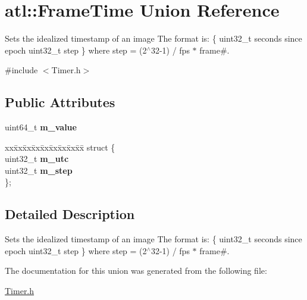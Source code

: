 \hypertarget{unionatl_1_1FrameTime}{}\section{atl\+:\+:Frame\+Time Union Reference}
\label{unionatl_1_1FrameTime}


Sets the idealized timestamp of an image The format is\+: \{ uint32\+\_\+t seconds since epoch uint32\+\_\+t step \} where step = (2$^\wedge$32-\/1) / fps $\ast$ frame\#.  




{\ttfamily \#include $<$Timer.\+h$>$}

\subsection*{Public Attributes}
\begin{DoxyCompactItemize}
\item 
uint64\+\_\+t {\bfseries m\+\_\+value}\hypertarget{unionatl_1_1FrameTime_a8dd45b9a9c6c634f6afa8e46fd99f22e}{}\label{unionatl_1_1FrameTime_a8dd45b9a9c6c634f6afa8e46fd99f22e}

\item 
\begin{tabbing}
xx\=xx\=xx\=xx\=xx\=xx\=xx\=xx\=xx\=\kill
struct \{\\
\>uint32\_t {\bfseries m\_utc}\\
\>uint32\_t {\bfseries m\_step}\\
\}; \hypertarget{unionatl_1_1FrameTime_a4335ca060cc3673ff9cb62a25047e92e}{}\label{unionatl_1_1FrameTime_a4335ca060cc3673ff9cb62a25047e92e}
\\

\end{tabbing}\end{DoxyCompactItemize}


\subsection{Detailed Description}
Sets the idealized timestamp of an image The format is\+: \{ uint32\+\_\+t seconds since epoch uint32\+\_\+t step \} where step = (2$^\wedge$32-\/1) / fps $\ast$ frame\#. 

The documentation for this union was generated from the following file\+:\begin{DoxyCompactItemize}
\item 
\hyperlink{Timer_8h}{Timer.\+h}\end{DoxyCompactItemize}

